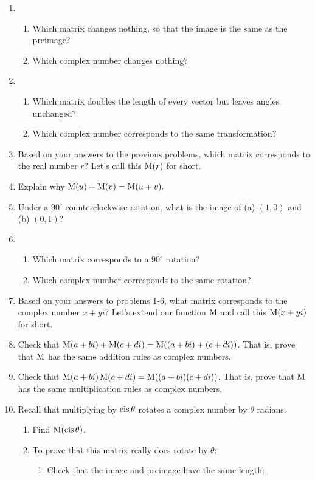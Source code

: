 \documentclass[../gatm.tex]{subfiles}
\begin{document}
\begin{enumerate}
\item \begin{enumerate}
\item Which matrix changes nothing, so that the image is the same as the preimage?
\item Which complex number changes nothing?
\end{enumerate}
\item \begin{enumerate}
\item Which matrix doubles the length of every vector but leaves angles unchanged?
\item Which complex number corresponds to the same transformation?
\end{enumerate}
\item Based on your answers to the previous problems, which matrix corresponds to the real number $r$? Let's call this $\operatorname{M} (r)$ for short.
\item Explain why $\operatorname{M} (u)+\operatorname{M}(v)=\operatorname{M}(u+v).$
\item Under a $90^\circ$ counterclockwise rotation, what is the image of (a) $(1,0)$ and (b) $(0,1)$?
\item \begin{enumerate}
\item Which matrix corresponds to a $90^\circ$ rotation?
\item Which complex number corresponds to the same rotation?
\end{enumerate}
\item Based on your answers to problems 1-6, what matrix corresponds to the complex number $x+yi$? Let's extend our function $\operatorname{M}$ and call this $\operatorname{M} (x+yi)$ for short.
\item Check that $\operatorname{M} (a+bi)+\operatorname{M} (c+di)=\operatorname{M}((a+bi)+(c+di))$. That is, prove that $\operatorname{M}$ has the same addition rules as complex numbers.
\item Check that $\operatorname{M} (a+bi)\operatorname{M} (c+di)=\operatorname{M}((a+bi)(c+di))$. That is, prove that $\operatorname{M}$ has the same multiplication rules as complex numbers.
\item Recall that multiplying by $\operatorname{cis}\theta$ rotates a complex number by $\theta$ radians. 
\begin{enumerate}
\item Find $\operatorname{M} (\operatorname{cis}\theta)$.
\item To prove that this matrix really does rotate by $\theta$:
\begin{enumerate}
\item Check that the image and preimage have the same length;

\end{enumerate}
\end{enumerate}
\end{enumerate}
\end{document}
